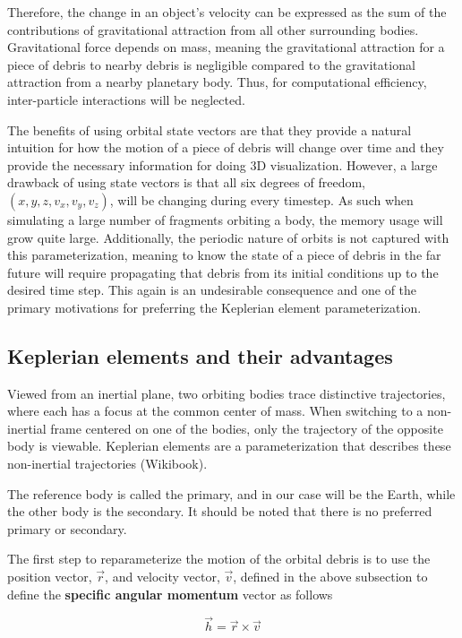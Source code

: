 \documentclass{article}
\newcommand{\boldindex}[1]{%
	\textbf{#1}\index{#1}%
}
\begin{document}
Therefore, the change in an object's velocity can be expressed as the sum of the contributions of gravitational attraction from all other surrounding bodies. Gravitational force depends on mass, meaning the gravitational attraction for a piece of debris to nearby debris is negligible compared to the gravitational attraction from a nearby planetary body. Thus, for computational efficiency, inter-particle interactions will be neglected.

The benefits of using orbital state vectors are that they provide a natural intuition for how the motion of a piece of debris will change over time and they provide the necessary information for doing 3D visualization. However, a large drawback of using state vectors is that all six degrees of freedom, $ (x, y, z, v_x, v_y, v_z)$, will be changing during every timestep. As such when simulating a large number of fragments orbiting a body, the memory usage will grow quite large. Additionally, the periodic nature of orbits is not captured with this parameterization, meaning to know the state of a piece of debris in the far future will require propagating that debris from its initial conditions up to the desired time step. This again is an undesirable consequence and one of the primary motivations for preferring the Keplerian element parameterization.
 
\newpage
\subsection{Keplerian elements and their advantages}

Viewed from an inertial plane, two orbiting bodies trace distinctive trajectories, where each has a focus at the common center of mass. When switching to a non-inertial frame centered on one of the bodies, only the trajectory of the opposite body is viewable. Keplerian elements are a parameterization that describes these non-inertial trajectories (Wikibook).

The reference body is called the primary, and in our case will be the Earth, while the other body is the secondary. It should be noted that there is no preferred primary or secondary.

The first step to reparameterize the motion of the orbital debris is to use the position vector, $\vec{r}$, and velocity vector, $\vec{v}$, defined in the above subsection to define the \boldindex{specific angular momentum} vector as follows

\begin{equation}
\vec{h} = \vec{r} \times \vec{v}
\end{equation}
\end{document}
